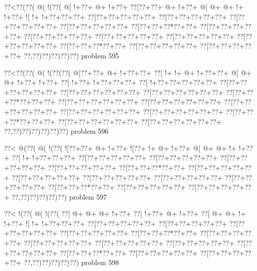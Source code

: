 \vbox{\vbox{\goo
\0??<\0??(\0??(\- @(\- !(\0??(
\- @[\- !+\0??+\- @+\- !+\0??+
\0??[\0??+\0??+\- @+\- !+\0??+
\- @[\- @+\- @+\- !+\- !+\0??+
\- ![\- !+\- !+\0??+\0??+\0??+
\0??[\0??+\0??+\0??+\0??+\0??+
\0??[\0??+\0??+\0??+\0??+\0??+
\0??[\0??+\0??+\0??+\0??+\0??+
\0??[\0??+\0??+\0??+\0??+\0??+
\0??[\0??+\0??+\0??*\0??+\0??+
\0??[\0??+\0??+\0??+\0??+\0??+
\0??[\0??+\0??+\0??+\0??+\0??+
\0??[\0??+\0??+\0??+\0??+\0??+
\0??[\0??+\0??+\0??+\0??+\0??+
\0??[\0??+\0??+\0??+\0??+\0??+
\0??[\0??+\0??+\0??*\0??+\0??+
\0??[\0??+\0??+\0??+\0??+\0??+
\0??[\0??+\0??+\0??+\0??+\0??+
\0??,\0??)\0??)\0??)\0??)\0??)
}
\hfil problem 595\hfil\break
}

\vbox{\vbox{\goo
\0??<\0??(\0??(\- @(\- !(\0??(\0??(
\- @[\0??+\0??+\- @+\- !+\0??+\0??+
\0??[\- !+\- !+\- @+\- !+\0??+\0??+
\- @[\- @+\- @+\- !+\0??+\- !+\0??+
\0??[\- !+\0??+\- !+\0??+\0??+\0??+
\0??[\- !+\0??+\0??+\0??+\0??+\0??+
\0??[\0??+\0??+\0??+\0??+\0??+\0??+
\0??[\0??+\0??+\0??+\0??+\0??+\0??+
\0??[\0??+\0??+\0??+\0??+\0??+\0??+
\0??[\0??+\0??+\0??*\0??+\0??+\0??+
\0??[\0??+\0??+\0??+\0??+\0??+\0??+
\0??[\0??+\0??+\0??+\0??+\0??+\0??+
\0??[\0??+\0??+\0??+\0??+\0??+\0??+
\0??[\0??+\0??+\0??+\0??+\0??+\0??+
\0??[\0??+\0??+\0??+\0??+\0??+\0??+
\0??[\0??+\0??+\0??*\0??+\0??+\0??+
\0??[\0??+\0??+\0??+\0??+\0??+\0??+
\0??[\0??+\0??+\0??+\0??+\0??+\0??+
\0??,\0??)\0??)\0??)\0??)\0??)\0??)
}
\hfil problem 596\hfil\break
}

\vbox{\vbox{\goo
\0??<\- @(\0??(\- @(\- !(\0??(
\- ![\0??+\0??+\- @+\- !+\0??+
\- ![\0??+\- !+\- @+\- !+\0??+
\- @[\- @+\- @+\- !+\- !+\0??+
\0??[\- !+\- !+\0??+\0??+\0??+
\0??[\0??+\0??+\0??+\0??+\0??+
\0??[\0??+\0??+\0??+\0??+\0??+
\0??[\0??+\0??+\0??+\0??+\0??+
\0??[\0??+\0??+\0??+\0??+\0??+
\0??[\0??+\0??+\0??*\0??+\0??+
\0??[\0??+\0??+\0??+\0??+\0??+
\0??[\0??+\0??+\0??+\0??+\0??+
\0??[\0??+\0??+\0??+\0??+\0??+
\0??[\0??+\0??+\0??+\0??+\0??+
\0??[\0??+\0??+\0??+\0??+\0??+
\0??[\0??+\0??+\0??*\0??+\0??+
\0??[\0??+\0??+\0??+\0??+\0??+
\0??[\0??+\0??+\0??+\0??+\0??+
\0??,\0??)\0??)\0??)\0??)\0??)
}
\hfil problem 597\hfil\break
}

\vbox{\vbox{\goo
\0??<\- !(\0??(\- @(\- !(\0??(
\0??[\- @+\- @+\- @+\- !+\0??+
\0??[\- !+\0??+\- @+\- !+\0??+
\0??[\- @+\- @+\- !+\- !+\0??+
\- ![\- !+\- !+\0??+\0??+\0??+
\0??[\0??+\0??+\0??+\0??+\0??+
\0??[\0??+\0??+\0??+\0??+\0??+
\0??[\0??+\0??+\0??+\0??+\0??+
\0??[\0??+\0??+\0??+\0??+\0??+
\0??[\0??+\0??+\0??*\0??+\0??+
\0??[\0??+\0??+\0??+\0??+\0??+
\0??[\0??+\0??+\0??+\0??+\0??+
\0??[\0??+\0??+\0??+\0??+\0??+
\0??[\0??+\0??+\0??+\0??+\0??+
\0??[\0??+\0??+\0??+\0??+\0??+
\0??[\0??+\0??+\0??*\0??+\0??+
\0??[\0??+\0??+\0??+\0??+\0??+
\0??[\0??+\0??+\0??+\0??+\0??+
\0??,\0??)\0??)\0??)\0??)\0??)
}
\hfil problem 598\hfil\break
}


